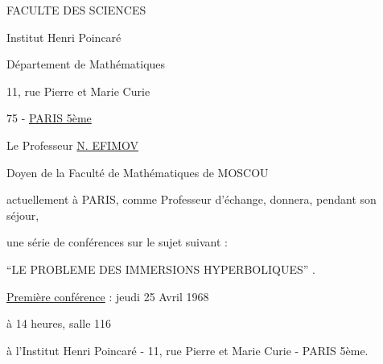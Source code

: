 FACULTE DES SCIENCES

Institut Henri Poincaré

Département de Mathématiques

11, rue Pierre et Marie Curie

75 - \uline{PARIS 5ème}

\begin{center}
Le Professeur \uline{N. EFIMOV}

Doyen de la Faculté de Mathématiques de MOSCOU
\end{center}

actuellement à PARIS, comme Professeur d'échange, donnera, pendant son séjour,

une série de conférences sur le sujet suivant :

\begin{center}``LE PROBLEME DES IMMERSIONS HYPERBOLIQUES'' .\end{center}

\uline{Première conférence} : jeudi 25 Avril 1968

à 14 heures, salle 116

à l'Institut Henri Poincaré - 11, rue Pierre et Marie Curie - PARIS 5ème.
